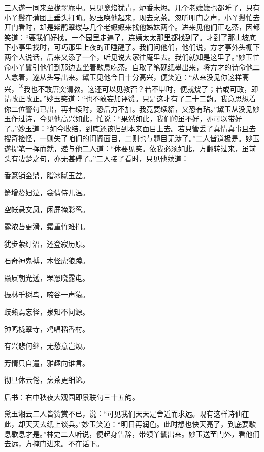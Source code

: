 三人遂一同来至栊翠庵中。只见龛焰犹青，炉香未烬。几个老嬷嬷也都睡了，只有小丫鬟在蒲团上垂头打盹。妙玉唤他起来，现去烹茶。忽听叩门之声，小丫鬟忙去开门看时，却是紫鹃翠缕与几个老嬷嬷来找他姊妹两个。进来见他们正吃茶，因都笑道：``要我们好找，一个园里走遍了，连姨太太那里都找到了。才到了那山坡底下小亭里找时，可巧那里上夜的正睡醒了。我们问他们，他们说，方才亭外头棚下两个人说话，后来又添了一个，听见说大家往庵里去。我们就知是这里了。''妙玉忙命小丫鬟引他们到那边去坐着歇息吃茶。自取了笔砚纸墨出来，将方才的诗命他二人念着，遂从头写出来。黛玉见他今日十分高兴，便笑道：``从来没见你这样高兴，\href{../Text/part0080_split_000.html\#lnkback_3_a}{\textsuperscript{③}}我也不敢唐突请教。这还可以见教否？若不堪时，便就烧了；若或可政，即请改正改正。''妙玉笑道：``也不敢妄加评赞。只是这才有了二十二韵。我意思想着你二位警句已出，再若续时，恐后力不加。我竟要续貂，又恐有玷。''黛玉从没见妙玉作过诗，今见他高兴如此，忙说：``果然如此，我们的虽不好，亦可以带好了。''妙玉道：``如今收结，到底还该归到本来面目上去。若只管丢了真情真事且去搜奇捡怪，一则失了咱们的闺阁面目，二则也与题目无涉了。''二人皆道极是。妙玉遂提笔一挥而就，递与他二人道：``休要见笑。依我必须如此，方翻转过来，虽前头有凄楚之句，亦无甚碍了。''二人接了看时，只见他续道：

香篆销金鼎，脂冰腻玉盆。

箫增嫠妇泣，衾倩侍儿温。

空帐悬文凤，闲屏掩彩鸳。

露浓苔更滑，霜重竹难扪。

犹步萦纡沼，还登寂历原。

石奇神鬼搏，木怪虎狼蹲。

赑屃朝光透，罘罳晓露屯。

振林千树鸟，啼谷一声猿。

歧熟焉忘径，泉知不问源。

钟鸣栊翠寺，鸡唱稻香村。

有兴悲何继，无愁意岂烦。

芳情只自遣，雅趣向谁言。

彻旦休云倦，烹茶更细论。

后书：右中秋夜大观园即景联句三十五韵。

黛玉湘云二人皆赞赏不已，说：``可见我们天天是舍近而求远。现有这样诗仙在此，却天天去纸上谈兵。''妙玉笑道：``明日再润色。此时想也快天亮了，到底要歇息歇息才是。''林史二人听说，便起身告辞，带领丫鬟出来。妙玉送至门外，看他们去远，方掩门进来。不在话下。

